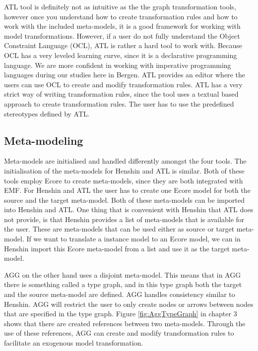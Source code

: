 ATL tool is definitely not as intuitive as
the the graph transformation tools, however once you understand how to create
transformation rules and how to work with the included meta-models, it is a
good framework for working with model transformations. However, if a user do
not fully understand the Object Constraint Language (OCL), ATL is rather a hard
tool to work with. Because OCL has a very leveled learning curve, since it is a
declarative programming language. We are more confident in working with
imperative programming languages during our studies here in Bergen. ATL
provides an editor where the users can use OCL to create and modify
transformation rules. ATL has a very strict way of writing transformation
rules, since the tool uses a textual based approach to create transformation
rules. The user has to use the predefined stereotypes defined by ATL.

\subsection{Meta-modeling}

Meta-models are initialised and handled differently amongst the four tools.
The initialisation of the meta-models for Henshin and ATL is similar. Both of
these tools employ Ecore to create meta-models, since they are both integrated
with EMF. For Henshin and ATL the user has to create one Ecore model for both the
source and the target meta-model. Both of these meta-models can be imported
into Henshin and ATL. One thing that is convenient with Henshin that ATL does
not provide, is that Henshin provides a list of meta-models that is available
for the user. These are meta-models that can be used either as source or target
meta-model. If we want to translate a instance model to an Ecore model, we can
in Henshin import this Ecore meta-model from a list and use it as the target
meta-model.

AGG on the other hand uses a disjoint meta-model. This means that in AGG there
is something called a type graph, and in this type graph both the target and
the source meta-model are defined. AGG handles consistency similar to
Henshin. AGG will restrict the user to only create nodes or arrows between
nodes that are specified in the type graph. Figure \ref{fig:AggTypeGraph}
in chapter 3 shows that there are created references between two meta-models.
Through the use of these references, AGG can create and modify transformation
rules to facilitate an exogenous model transformation.  

